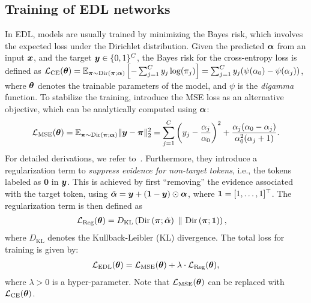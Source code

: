 \subsection{Training of EDL networks}
In EDL, models are usually trained by minimizing the Bayes risk, which involves the expected loss under the Dirichlet distribution. Given the predicted $\bm{\alpha}$ from an input  $\bm{x}$, and the target $\bm{y} \in \{0, 1\}^C$, the Bayes risk for the cross-entropy loss is defined as $\mathcal{L}_{\text{CE}}(\bm{\theta}) = \mathbb{E}_{\bm{\pi} \sim \text{Dir}\left( \bm{\pi}; \bm{\alpha} \right)}\left[ - \sum_{j=1}^C y_j \log(\pi_j)\right] = \sum_{j=1}^C y_j (\psi(\alpha_0) - \psi(\alpha_j))$,
where $\bm{\theta}$ denotes the trainable parameters of the model, and $\psi$ is the \emph{digamma} function. To stabilize the training, \citet{sensoy2018evidential} introduce the MSE loss as an alternative objective, which can be analytically computed using $\bm{\alpha}$:
\begin{equation}
    \begin{aligned}
        \mathcal{L}_{\text{MSE}}(\bm{\theta}) = \mathbb{E}_{\bm{\pi} \sim \text{Dir}\left( \bm{\pi}; \bm{\alpha} \right)} \|\bm{y} - \bm{\pi}\|^2_2 = \sum_{j=1}^C \left(y_j - \frac{\alpha_j}{\alpha_0}\right)^2 + \frac{\alpha_j (\alpha_0 - \alpha_j)}{\alpha_0^2 (\alpha_j + 1)}.
    \end{aligned}
    \label{eq:loss_mse}
\end{equation}
For detailed derivations, we refer to~\citet{sensoy2018evidential}. Furthermore, they introduce a regularization term to \emph{suppress evidence for non-target tokens}, i.e., the tokens labeled as $\bm{0}$ in $\bm{y}$. This is achieved by first ``removing'' the evidence associated with the target token, using $\tilde{\bm{\alpha}} = \bm{y} + (\bm{1} - \bm{y}) \odot \bm{\alpha}$, where $\bm{1} = [1, \ldots, 1]^\top$. The regularization term is then defined as
\begin{equation}
    \begin{aligned}
        \mathcal{L}_{\text{Reg}}(\bm{\theta}) &= D_{\text{KL}}\left(\text{Dir}\left( \bm{\pi}; \tilde{\bm{\alpha}} \right) \ \| \ \text{Dir}\left( \bm{\pi}; \bm{1} \right) \right),
    \end{aligned}
    \label{eq:loss_reg}
\end{equation}
where $D_{\text{KL}}$ denotes the Kullback-Leibler (KL) divergence. The total loss for training is given by: 
\begin{equation}
    \begin{aligned}
        \mathcal{L}_{\text{EDL}}(\bm{\theta}) = \mathcal{L}_{\text{MSE}}(\bm{\theta}) + \lambda \cdot \mathcal{L}_{\text{Reg}}(\bm{\theta}),
    \end{aligned}
    \label{eq:loss_edl}
\end{equation}
where $\lambda > 0$ is a hyper-parameter. Note that $\mathcal{L}_{\text{MSE}}(\bm{\theta})$ can be replaced with $\mathcal{L}_{\text{CE}}(\bm{\theta})$. 

